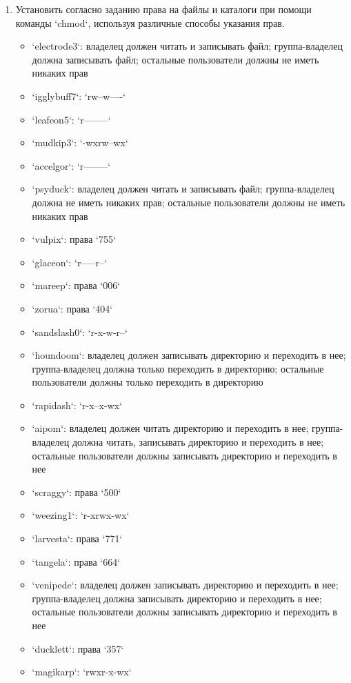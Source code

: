 \begin{enumerate}
        \item Установить согласно заданию права на файлы и каталоги при помощи команды `chmod`, используя различные способы указания прав.
        \begin{itemize}
            \item `electrode3`: владелец должен читать и записывать файл; группа-владелец должна записывать файл; остальные пользователи должны не иметь никаких прав
            \item `igglybuff7`: `rw--w----`
            \item `leafeon5`: `r--------`
            \item `mudkip3`: `-wxrw--wx`
            \item `accelgor`: `r--------`
            \item `psyduck`: владелец должен читать и записывать файл; группа-владелец должна не иметь никаких прав; остальные пользователи должны не иметь никаких прав
            \item `vulpix`: права `755`
            \item `glaceon`: `r-----r--`
            \item `mareep`: права `006`
            \item `zorua`: права `404`
            \item `sandslash0`: `r-x-w-r--`
            \item `houndoom`: владелец должен записывать директорию и переходить в нее; группа-владелец должна только переходить в директорию; остальные пользователи должны только переходить в директорию
            \item `rapidash`: `r-x--x-wx`
            \item `aipom`: владелец должен читать директорию и переходить в нее; группа-владелец должна читать, записывать директорию и переходить в нее; остальные пользователи должны записывать директорию и переходить в нее
            \item `scraggy`: права `500`
            \item `weezing1`: `r-xrwx-wx`
            \item `larvesta`: права `771`
            \item `tangela`: права `664`
            \item `venipede`: владелец должен записывать директорию и переходить в нее; группа-владелец должна записывать директорию и переходить в нее; остальные пользователи должны записывать директорию и переходить в нее
            \item `ducklett`: права `357`
            \item `magikarp`: `rwxr-x-wx`
        \end{itemize}


\end{enumerate}

